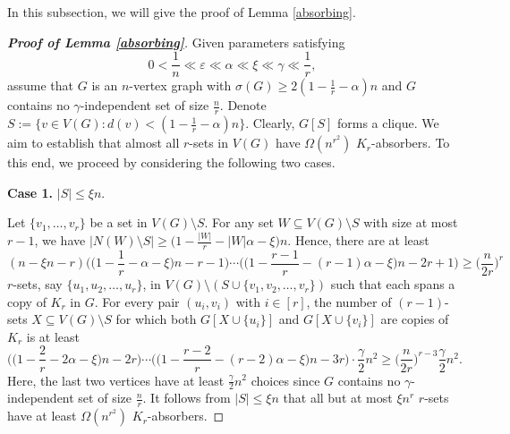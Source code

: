 \documentclass[11pt, a4paper]{article}
\theoremstyle{definition}
\newcommand{\eps}{\varepsilon}
\newcommand{\<}{\subseteq}
\begin{document}
In this subsection, we will give the proof of Lemma \ref{absorbing}. 
\begin{proof}[\bf Proof of Lemma \ref{absorbing}]
    Given parameters satisfying 
   $$0<\frac{1}{n}\ll\eps\ll\alpha\ll\xi\ll \gamma\ll \frac{1}{r},
   $$
   assume that $G$ is an $n$-vertex graph with $\sigma(G)\geq 2(1-\frac{1}{r}-\alpha)n$ and $G$ contains no  $\gamma$-independent set of size $\frac{n}{r}$. %
   Denote $S:=\{v\in V(G):d(v)<(1-\frac{1}{r}-\alpha)n\}$. Clearly, $G[S]$ forms a clique. We aim to establish that almost all  $r$-sets in $V(G)$ have $\Omega(n^{r^2})$ $K_r$-absorbers. To this end, we proceed by considering the following two cases.

    
\medskip
    {\bf Case 1.} $|S|\leq \xi n$. 
\medskip

Let $\{v_1,\ldots,v_r\}$ be a set in $V(G)\setminus S$. For any set $W\subseteq V(G)\setminus S$ with size at most $r-1$, we have $|N(W)\setminus S|\geq \big(1-\frac{|W|}{r}-|W|\alpha-\xi\big)n$. %
Hence, there are at least 
$$
(n-{\xi}n-r)\Big(\big(1-\frac{1}{r}-\alpha-\xi\big)n-r-1\Big)\cdots\Big(\big(1-\frac{r-1}{r}-(r-1)\alpha-\xi\big)n-2r+1\Big)\geq \Big(\frac{n}{2r}\Big)^r
$$
$r$-sets, say $\{u_1,u_2,\ldots,u_r\}$,  in $V(G)\setminus (S\cup \{v_1,v_2,\ldots, v_r\})$ such that each spans a copy of $K_r$ in $G$. 
For every pair $(u_i,v_i)$ with $i\in [r]$, the number of $(r-1)$-sets $X\subseteq  V(G)\setminus S$ for which both $G[X\cup \{u_i\}]$ and $G[X\cup \{v_i\}]$ are copies of $K_r$ is at least 
$$
\Big(\big(1-\frac{2}{r}-2\alpha-\xi\big)n-2r\Big)\cdots\Big(\big(1-\frac{r-2}{r}-(r-2)\alpha-\xi\big)n-3r\Big)\cdot \frac{\gamma}{2}n^2\geq \Big(\frac{n}{2r}\Big)^{r-3}\frac{\gamma}{2}n^2.
$$ 
Here, the last two vertices have at least $\frac{\gamma}{2}n^2$ choices since $G$ contains no $\gamma$-independent set of size $\frac{n}{r}$. 
It follows from $|S|\leq \xi n$ that all but at most $\xi n^r$ $r$-sets %
have at least $\Omega(n^{r^2})$ $K_r$-absorbers.  



\end{proof}
\end{document}
